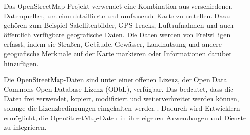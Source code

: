 Das OpenStreetMap-Projekt verwendet eine Kombination aus verschiedenen Datenquellen, um eine
detaillierte und umfassende Karte zu erstellen. Dazu gehören zum Beispiel Satellitenbilder,
GPS-Tracks, Luftaufnahmen und auch öffentlich verfügbare geografische Daten. Die Daten werden von
Freiwilligen erfasst, indem sie Straßen, Gebäude, Gewässer, Landnutzung und andere geografische
Merkmale auf der Karte markieren oder Informationen darüber hinzufügen.

Die OpenStreetMap-Daten sind unter einer offenen Lizenz, der Open Data Commons Open Database Lizenz
(ODbL), verfügbar. Das bedeutet, dass die Daten frei verwendet, kopiert, modifiziert und
weiterverbreitet werden können, solange die Lizenzbedingungen eingehalten werden \cite{osm.license}.
Dadurch wird Entwicklern ermöglicht, die OpenStreetMap-Daten in ihre eigenen Anwendungen und
Dienste zu integrieren.